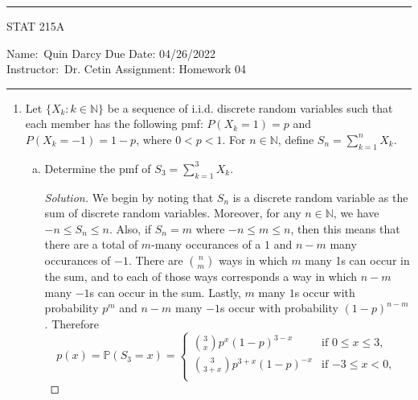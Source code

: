 \documentclass[12pt]{article}
\newenvironment{solution}
{\renewcommand\qedsymbol{$\blacksquare$}\begin{proof}[Solution]}
{\end{proof}}
\begin{document}
    \thispagestyle{empty}\hrule

    \begin{center}
        \vspace{.4cm} { \large STAT 215A}
    \end{center}
    {Name:\ Quin Darcy \hspace{\fill} Due Date: 04/26/2022   \\
    { Instructor:}\ Dr. Cetin \hspace{\fill} Assignment:
    Homework 04 \\ \hrule}

    \begin{enumerate}
        \item Let $\{X_k:k\in\mathbb{N}\}$ be a sequence of i.i.d. discrete
            random variables such that each member has the following pmf:
            $P(X_k=1)=p$ and $P(X_k=-1)=1-p$, where $0<p<1$. For
            $n\in\mathbb{N}$, define $S_n=\sum\limits_{k=1}^{n}X_k$. 
            \begin{enumerate}[(a)]
                \item Determine the pmf of $S_3=\sum\limits_{k=1}^{3}X_k$. 
                    \begin{solution}
                        We begin by noting that $S_n$ is a discrete random
                        variable as the sum of discrete random variables.
                        Moreover, for any $n\in\mathbb{N}$, we
                        have $-n\leq S_n\leq n$. Also, if $S_n=m$ where $-n\leq
                        m\leq n$, then this means that there are a total of
                        $m$-many occurances of a $1$ and $n-m$ many occurances
                        of $-1$. There are $\binom{n}{m}$ ways in which $m$
                        many 1s can occur in the sum, and to each of those ways
                        corresponds a way in which $n-m$ many $-1$s can occur
                        in the sum. Lastly, $m$ many $1$s occur with
                        probability $p^m$ and $n-m$ many $-1$s occur with
                        probability $(1-p)^{n-m}$. Therefore
                        \begin{equation*}
                            p(x)=\mathbb{P}(S_3=x)=\begin{cases}
                                \binom{3}{x}p^x(1-p)^{3-x} &\text{if $0\leq
                                x\leq 3$,} \\
                                \binom{3}{3+x}p^{3+x}(1-p)^{-x} &\text{if
                                $-3\leq x<0$, } \\

\end{cases}
\end{equation*}
\end{solution}
\end{enumerate}
\end{enumerate}
\end{document}
